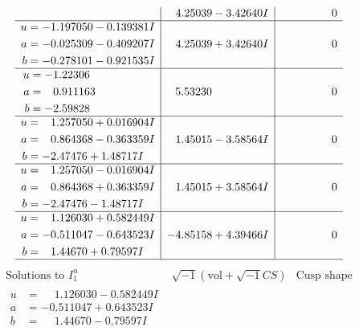 \documentclass[1p]{elsarticle_modified}
\theoremstyle{definition}
\newcommand{\I}{\sqrt{-1}}
\begin{document}
$$\begin{array}{c|c|c}
 & \phantom{-}4.25039 - 3.42640 I & \phantom{-0.000000 } 0 \\ \hline\begin{aligned}
u &= -1.197050 - 0.139381 I \\
a &= -0.025309 - 0.409207 I \\
b &= -0.278101 - 0.921535 I\end{aligned}
 & \phantom{-}4.25039 + 3.42640 I & \phantom{-0.000000 } 0 \\ \hline\begin{aligned}
u &= -1.22306\phantom{ +0.000000I} \\
a &= \phantom{-}0.911163\phantom{ +0.000000I} \\
b &= -2.59828\phantom{ +0.000000I}\end{aligned}
 & \phantom{-}5.53230\phantom{ +0.000000I} & \phantom{-0.000000 } 0 \\ \hline\begin{aligned}
u &= \phantom{-}1.257050 + 0.016904 I \\
a &= \phantom{-}0.864368 - 0.363359 I \\
b &= -2.47476 + 1.48717 I\end{aligned}
 & \phantom{-}1.45015 - 3.58564 I & \phantom{-0.000000 } 0 \\ \hline\begin{aligned}
u &= \phantom{-}1.257050 - 0.016904 I \\
a &= \phantom{-}0.864368 + 0.363359 I \\
b &= -2.47476 - 1.48717 I\end{aligned}
 & \phantom{-}1.45015 + 3.58564 I & \phantom{-0.000000 } 0 \\ \hline\begin{aligned}
u &= \phantom{-}1.126030 + 0.582449 I \\
a &= -0.511047 - 0.643523 I \\
b &= \phantom{-}1.44670 + 0.79597 I\end{aligned}
 & -4.85158 + 4.39466 I & \phantom{-0.000000 } 0\\
 \hline 
 \end{array}$$\newpage$$\begin{array}{c|c|c}  
\text{Solutions to }I^u_{1}& \I (\text{vol} + \sqrt{-1}CS) & \text{Cusp shape}\\
 \hline 
\begin{aligned}
u &= \phantom{-}1.126030 - 0.582449 I \\
a &= -0.511047 + 0.643523 I \\
b &= \phantom{-}1.44670 - 0.79597 I\end{aligned}

\end{array}$$
\end{document}
